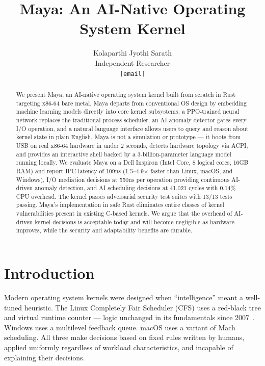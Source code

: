 \documentclass[letterpaper,twocolumn,10pt]{article}
\begin{document}
\title{Maya: An AI-Native Operating System Kernel}

\author{
  Kolaparthi Jyothi Sarath \\
  Independent Researcher \\
  \texttt{[email]}
}

\maketitle

\begin{abstract}
We present Maya, an AI-native operating system
kernel built from scratch in Rust targeting
x86-64 bare metal. Maya departs from conventional
OS design by embedding machine learning models
directly into core kernel subsystems: a
PPO-trained neural network replaces the traditional
process scheduler, an AI anomaly detector gates
every I/O operation, and a natural language
interface allows users to query and reason about
kernel state in plain English. Maya is not a
simulation or prototype --- it boots from USB
on real x86-64 hardware in under 2 seconds,
detects hardware topology via ACPI, and provides
an interactive shell backed by a 3-billion-parameter
language model running locally. We evaluate Maya
on a Dell Inspiron (Intel Core, 8 logical cores,
16GB RAM) and report IPC latency of 109ns
(1.5--4.9$\times$ faster than Linux, macOS,
and Windows), I/O mediation decisions at 550ns
per operation providing continuous AI-driven
anomaly detection, and AI scheduling decisions
at 41,021 cycles with 0.14\% CPU overhead.
The kernel passes adversarial security test
suites with 13/13 tests passing. Maya's
implementation in safe Rust eliminates entire
classes of kernel vulnerabilities present in
existing C-based kernels. We argue that the
overhead of AI-driven kernel decisions is
acceptable today and will become negligible
as hardware improves, while the security and
adaptability benefits are durable.
\end{abstract}

\section{Introduction}

Modern operating system kernels were designed
when ``intelligence'' meant a well-tuned
heuristic. The Linux Completely Fair Scheduler
(CFS) uses a red-black tree and virtual runtime
counter --- logic unchanged in its fundamentals
since 2007~\cite{linux-cfs}. Windows uses a
multilevel feedback queue. macOS uses a variant
of Mach scheduling. All three make decisions
based on fixed rules written by humans, applied
uniformly regardless of workload characteristics,
and incapable of explaining their decisions.
\end{document}
